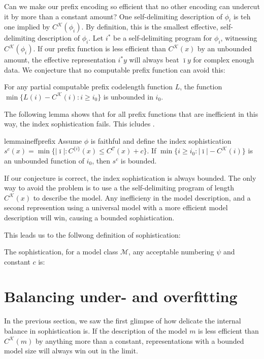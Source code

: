 \documentclass{style/llncs}
\newcommand{\M}{\mathscr M}
\newcommand{\C}{\mathscr C}
\newcommand{\K}{\mathscr K}
\begin{document}
Can we make our prefix encoding so efficient that no other encoding can undercut it by more than a constant amount? One self-delimiting description of $\phi_i$ is teh one implied by $C^\K(\phi_i)$. By definition, this is the smallest effective, self-delimiting description of $\phi_i$. Let $i^*$ be a self-delimiting program for $\phi_i$, witnessing $C^\K(\phi_i)$. If our prefix function is less efficient than $C^\K(x)$ by an unbounded amount, the effective representation $i^*y$ will always beat $\bar\imath y$ for complex enough data. We conjecture that no computable prefix function can avoid this:
\begin{conjecture}
For any partial computable prefix codelength function $L$, the function $\min\{L(i)-C^\K(i):i\ge i_0\}$
is unbounded in $i_0$.
\end{conjecture}
The following lemma shows that for all prefix functions that are inefficient in this way, the index sophistication fails. This icludes \cite{adriaans2012facticity}.
\begin{restatable}{lemma}{ineffprefix}
Assume $\phi$ is faithful and define the index sophistication $s^c(x)=\min\{|\bar\imath|:C^{\{i\}}(x)\le C^{\C}(x)+c\}$.
If $\min\{i\ge i_0:|\bar\imath|-C^\K(i)\}$ is an unbounded function of $i_0$, then $s^c$ is bounded.\label{lemma:prefix-inefficiency}
\end{restatable}

If our conjecture is correct, the index sophistication is always bounded. The only way to avoid the problem is to use a the self-delimiting program of length $C^\K(x)$ to describe the model. Any inefficieny in the model description, and a second represention using a universal model with a more efficient model description will win, causing a bounded sophistication.

This leads us to the follwong definition of sophistication:
\begin{definition}
The sophistication, for a model class $\M$, any acceptable numbering $\psi$ and constant $c$ is:
\end{definition}

\section{Balancing under- and overfitting}
\label{section:balance}

In the previous section, we saw the first glimpse of how delicate the internal balance in sophistication is. If the description of the model $m$ is less efficient than $C^\K(m)$ by anything more than a constant, representations with a bounded model size will always win out in the limit.
\end{document}
